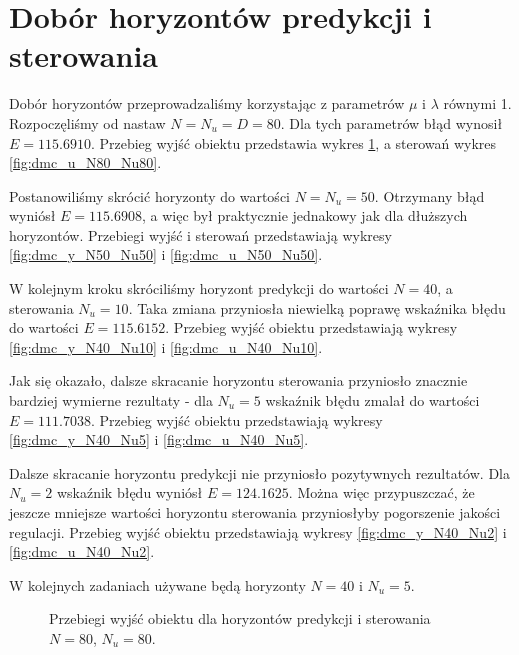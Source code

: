 \section{Dobór horyzontów predykcji i sterowania}
Dobór horyzontów przeprowadzaliśmy korzystając z parametrów $\mu$ i $\lambda$ równymi 1. Rozpoczęliśmy od nastaw $N=N_u=D=80$. Dla tych parametrów błąd wynosił $E=\num{115,6910}$. Przebieg wyjść obiektu przedstawia wykres \ref{fig:dmc_y_N80_Nu80}, a sterowań wykres \ref{fig:dmc_u_N80_Nu80}.

Postanowiliśmy skrócić horyzonty do wartości $N=N_u=50$. Otrzymany błąd wyniósł $E=\num{115,6908}$, a więc był praktycznie jednakowy jak dla dłuższych horyzontów. Przebiegi wyjść i sterowań przedstawiają wykresy \ref{fig:dmc_y_N50_Nu50} i \ref{fig:dmc_u_N50_Nu50}.

W kolejnym kroku skróciliśmy horyzont predykcji do wartości $N=40$, a sterowania  $N_u=10$. Taka zmiana przyniosła niewielką poprawę wskaźnika błędu do wartości $E=\num{115,6152}$. Przebieg wyjść obiektu przedstawiają wykresy \ref{fig:dmc_y_N40_Nu10} i \ref{fig:dmc_u_N40_Nu10}.

Jak się okazało, dalsze skracanie horyzontu sterowania przyniosło znacznie bardziej wymierne rezultaty - dla $N_u=5$  wskaźnik błędu zmalał do wartości $E=\num{111,7038}$. Przebieg wyjść obiektu przedstawiają wykresy \ref{fig:dmc_y_N40_Nu5} i \ref{fig:dmc_u_N40_Nu5}.

Dalsze skracanie horyzontu predykcji nie przyniosło pozytywnych rezultatów. Dla $N_u=2$ wskaźnik błędu wyniósł $E=\num{124,1625}$. Można więc przypuszczać, że jeszcze mniejsze wartości horyzontu sterowania przyniosłyby pogorszenie jakości regulacji. Przebieg wyjść obiektu przedstawiają wykresy \ref{fig:dmc_y_N40_Nu2} i \ref{fig:dmc_u_N40_Nu2}.

W kolejnych zadaniach używane będą horyzonty $N=40$ i $N_u=5$.

\begin{figure}[tb]
	\centering
	\caption{Przebiegi wyjść obiektu dla horyzontów predykcji i sterowania $N=80$, $N_u=80$.}
	\label{fig:dmc_y_N80_Nu80}
\end{figure}

